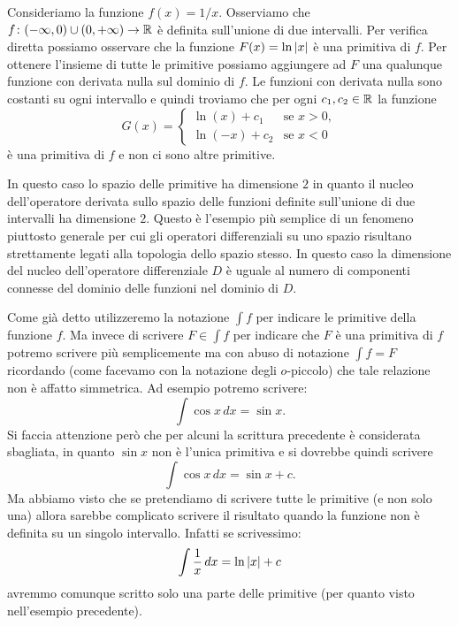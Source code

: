 \begin{example}
\mymark{*}
Consideriamo la funzione $f(x) = 1/x$. Osserviamo che
$f\colon (-\infty, 0) \cup (0,+\infty)\to \mathbb R$ è definita sull'unione di due
intervalli. Per verifica diretta possiamo osservare che la funzione
$F(x) = \ln {\left|x\right|}$ è una primitiva di $f$. Per ottenere l'insieme di tutte
le primitive possiamo aggiungere ad $F$ una qualunque funzione con derivata
nulla sul dominio di $f$. Le funzioni con derivata nulla sono costanti su ogni
intervallo e quindi troviamo che per ogni $c_1, c_2\in \mathbb R$ la funzione
\[
G(x) =
\begin{cases}
  \ln (x) + c_1 &\text{se $x>0$},\\
  \ln (-x) + c_2 & \text{se $x<0$}
\end{cases}
\]
è una primitiva di $f$ e non ci sono altre primitive.

In questo caso lo spazio delle primitive ha dimensione $2$ in quanto il nucleo
dell'operatore derivata sullo spazio delle funzioni definite sull'unione di
due intervalli ha dimensione $2$.
Questo è l'esempio più semplice di un fenomeno piuttosto generale per cui gli
operatori differenziali su uno spazio risultano strettamente legati alla
topologia dello spazio stesso. In questo caso la dimensione del nucleo
dell'operatore differenziale $D$ è uguale al numero di componenti connesse del
dominio delle funzioni nel dominio di $D$.
\end{example}

Come già detto utilizzeremo la notazione $\int f$ per indicare le primitive
della funzione $f$.
Ma invece di scrivere $F\in \int f$
per indicare che $F$ è una primitiva di $f$
potremo scrivere
più semplicemente ma con abuso di notazione $\int f = F$
ricordando (come facevamo con la notazione degli $o$-piccolo) che tale relazione
non è affatto simmetrica.
Ad esempio potremo scrivere:
\[
  \int \cos x\, dx = \sin x.
\]
Si faccia attenzione però che per alcuni la scrittura precedente
è considerata sbagliata, in quanto $\sin x$ non è l'unica primitiva e si dovrebbe
quindi scrivere
\[
  \int \cos x\, dx = \sin x + c.
\]
Ma abbiamo visto che se pretendiamo di scrivere tutte le primitive (e non solo una)
allora sarebbe complicato scrivere il risultato quando la funzione non è definita
su un singolo intervallo. Infatti se scrivessimo:
\[
  \int \frac 1 x\, dx = \ln {\left|x\right|} + c
\]
avremmo comunque scritto solo una parte delle primitive (per quanto visto nell'esempio
precedente).

